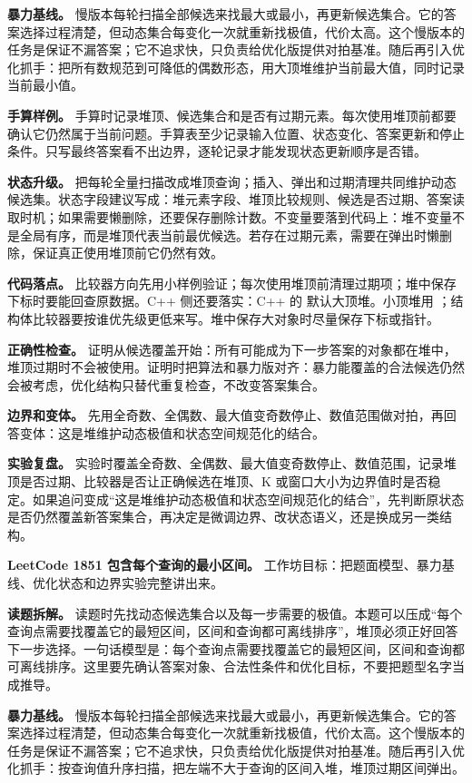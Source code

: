 \textbf{暴力基线。} 慢版本每轮扫描全部候选来找最大或最小，再更新候选集合。它的答案选择过程清楚，但动态集合每变化一次就重新找极值，代价太高。这个慢版本的任务是保证不漏答案；它不追求快，只负责给优化版提供对拍基准。随后再引入优化抓手：把所有数规范到可降低的偶数形态，用大顶堆维护当前最大值，同时记录当前最小值。

\textbf{手算样例。} 手算时记录堆顶、候选集合和是否有过期元素。每次使用堆顶前都要确认它仍然属于当前问题。手算表至少记录输入位置、状态变化、答案更新和停止条件。只写最终答案看不出边界，逐轮记录才能发现状态更新顺序是否错。

\textbf{状态升级。} 把每轮全量扫描改成堆顶查询；插入、弹出和过期清理共同维护动态候选集。状态字段建议写成：堆元素字段、堆顶比较规则、候选是否过期、答案读取时机；如果需要懒删除，还要保存删除计数。不变量要落到代码上：堆不变量不是全局有序，而是堆顶代表当前最优候选。若存在过期元素，需要在弹出时懒删除，保证真正使用堆顶前它仍然有效。

\textbf{代码落点。} 比较器方向先用小样例验证；每次使用堆顶前清理过期项；堆中保存下标时要能回查原数据。C++ 侧还要落实：C++ 的  默认大顶堆。小顶堆用 ；结构体比较器要按谁优先级更低来写。堆中保存大对象时尽量保存下标或指针。

\textbf{正确性检查。} 证明从候选覆盖开始：所有可能成为下一步答案的对象都在堆中，堆顶过期时不会被使用。证明时把算法和暴力版对齐：暴力能覆盖的合法候选仍然会被考虑，优化结构只替代重复检查，不改变答案集合。

\textbf{边界和变体。} 先用全奇数、全偶数、最大值变奇数停止、数值范围做对拍，再回答变体：这是堆维护动态极值和状态空间规范化的结合。

\textbf{实验复盘。} 实验时覆盖全奇数、全偶数、最大值变奇数停止、数值范围，记录堆顶是否过期、比较器是否让正确候选在堆顶、K 或窗口大小为边界值时是否稳定。如果追问变成“这是堆维护动态极值和状态空间规范化的结合”，先判断原状态是否仍然覆盖新答案集合，再决定是微调边界、改状态语义，还是换成另一类结构。

\noindent\textbf{LeetCode 1851 包含每个查询的最小区间。} 工作坊目标：把题面模型、暴力基线、优化状态和边界实验完整讲出来。

\textbf{读题拆解。} 读题时先找动态候选集合以及每一步需要的极值。本题可以压成“每个查询点需要找覆盖它的最短区间，区间和查询都可离线排序”，堆顶必须正好回答下一步选择。一句话模型是：每个查询点需要找覆盖它的最短区间，区间和查询都可离线排序。这里要先确认答案对象、合法性条件和优化目标，不要把题型名字当成推导。

\textbf{暴力基线。} 慢版本每轮扫描全部候选来找最大或最小，再更新候选集合。它的答案选择过程清楚，但动态集合每变化一次就重新找极值，代价太高。这个慢版本的任务是保证不漏答案；它不追求快，只负责给优化版提供对拍基准。随后再引入优化抓手：按查询值升序扫描，把左端不大于查询的区间入堆，堆顶过期区间弹出。

